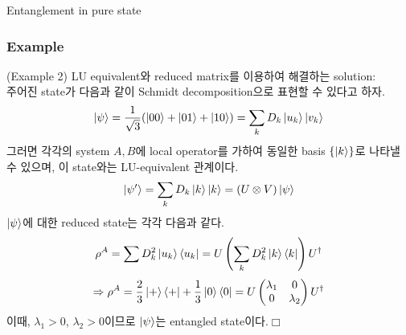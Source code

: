 \documentclass[9pt]{beamer}
\begin{document}
\begin{section}{Entanglement in pure state}
        \begin{frame}
            \frametitle{Example}
            (Example 2) LU equivalent와 reduced matrix를 이용하여 해결하는 solution:\\
            주어진 state가 다음과 같이 Schmidt decomposition으로 표현할 수 있다고 하자.
            \begin{equation*}
                \ket{\psi} = \frac{1}{\sqrt 3}(\ket{00} + \ket{01} + \ket{10}) = \sum_k D_k \ket{u_k} \ket{v_k}
            \end{equation*}
            그러면 각각의 system $A, B$에 local operator를 가하여 동일한 basis $\{\ket k\}$로 나타낼 수 있으며, 이 state와는 LU-equivalent 관계이다.
            \begin{equation*}
                \ket{\psi'} = \sum_k D_k \ket{k} \ket{k} = (U \otimes V) \ket{\psi}
            \end{equation*}
            $\ket{\psi}$에 대한 reduced state는 각각 다음과 같다.
            \begin{equation*}
                \rho^A = \sum D_k^2 \ket{u_k} \bra{u_k} = U\left(\sum_k D_k^2 \ket{k} \bra{k}\right)U^\dagger
            \end{equation*}
            \begin{equation*}
                \Rightarrow \rho^A = \frac{2}{3} \ket + \bra + + \frac{1}{3} \ket 0 \bra 0= U\begin{pmatrix} \lambda_1 & 0 \\ 0 & \lambda_2 \end{pmatrix}U^\dagger
            \end{equation*}
            이때, $\lambda_1 > 0$, $\lambda_2 > 0$이므로 $\ket{\psi}$는 entangled state이다.$\Box$
        \end{frame}


\end{section}
\end{document}
